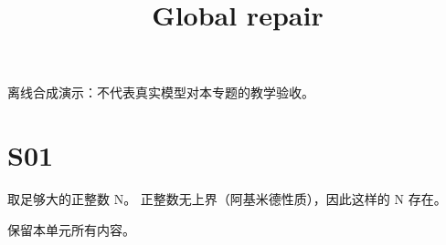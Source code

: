 \documentclass[UTF8,fontset=fandol,11pt]{ctexart}
\title{Global repair}
\date{}
\begin{document}
\maketitle
\par\noindent 离线合成演示：不代表真实模型对本专题的教学验收。\par
\section{S01}\label{sec:S01}
取足够大的正整数 N。 正整数无上界（阿基米德性质），因此这样的 N 存在。\par
保留本单元所有内容。\par
\end{document}
